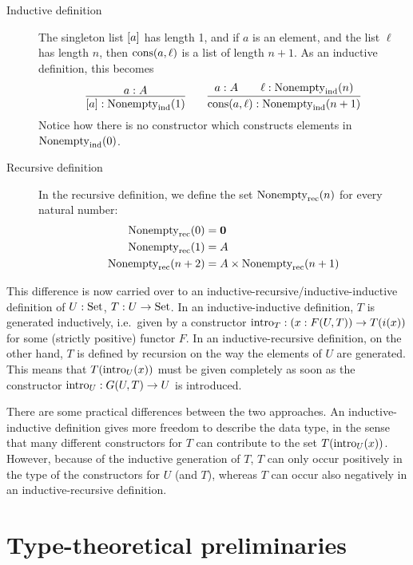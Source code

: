 \documentclass{article}
\begin{document}
\begin{description}
\item[Inductive definition] The singleton list $[a]$ has length 1, and if $a$ is
  an element, and the list $\ell$ has length $n$, then
  $\text{cons}(a, \ell)$ is a list of length $n + 1$. As an inductive
  definition, this becomes
\[
\infer{\singleVec{a} : \Vecind(1)}{a : A} \qquad \infer{\consVec{a}{\ell} :
  \Vecind(n + 1)}{a : A & \quad \ell : \Vecind(n)}
\]
Notice how there is no constructor which constructs elements in
$\text{Nonempty}_{\text{ind}}(0)$.
\item[Recursive definition] In the recursive definition, we define the
  set $\text{Nonempty}_{\text{rec}}(n)$ for every natural number:
  \begin{align*}
    \text{Nonempty}_{\text{rec}}(0) &= \mathbf{0} \\
    \text{Nonempty}_{\text{rec}}(1) &= A \\
    \text{Nonempty}_{\text{rec}}(n + 2) &= A \times \text{Nonempty}_{\text{rec}}(n + 1)
  \end{align*}

\end{description}

This difference is now carried over to an
inductive-recursive/inductive-inductive definition of $U : \text{Set}$, $T :
U \to \text{Set}$.
In an inductive-inductive definition, $T$ is generated
inductively, i.e.\ given by a constructor $\text{intro}_{T} : (x : F(U, T))
\to T(i(x))$ for some (strictly positive) functor
$F$. %
In an inductive-recursive definition, on the other hand, $T$ is
defined by recursion on the way the elements of $U$ are
generated. This means that $T(\text{intro}_{U}(x))$ must be given completely
as soon as the constructor $\text{intro}_{U} : G(U, T) \to U$ is introduced.


There are some practical differences between the two approaches. An
inductive-inductive definition gives more freedom to describe the data
type, in the sense that many different constructors for $T$ can
contribute to the set $T(\text{intro}_{U}(x))$.  However, because of the
inductive generation of $T$, $T$ can only occur positively in the type
of the constructors for $U$ (and $T$), whereas $T$ can occur also
negatively in an inductive-recursive definition.

\section{Type-theoretical preliminaries}
\label{sec:preliminaries}
\end{document}
